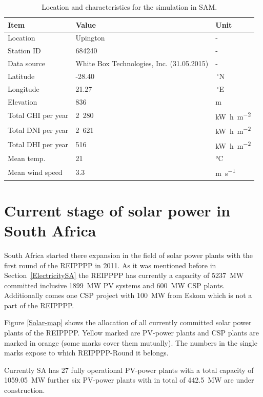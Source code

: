 \begin{table}[!h]  
  \centering
	\begin{tabular}{  p{4.0cm}  C{4.0cm}  C{3.0cm} } 
	\hline	
\textbf{Item}  & \textbf{Value} & \textbf{Unit} \\ \hline \hline
Location & Upington & -\\ 
Station ID &  684240& -  \\ 
Data source & White Box Technologies, Inc. (31.05.2015) & -\\ \hline
Latitude & -28.40 &$\,^{\circ}$N \\ 
Longitude &  21.27 &$\,^{\circ}$E \\ 
Elevation &  836 & m \\ 
Total GHI per year  &  2~280 & \si{\kilo\watt\hour\per\square\metre}\\ 
Total DNI per year &  2~621 & \si{\kilo\watt\hour\per\square\metre}\\ 
Total DHI per year &  516 & \si{\kilo\watt\hour\per\square\metre}\\ 
Mean temp. &  21 & \si{\celsius}\\ 
Mean wind speed & 3.3 & \si{\metre\per\second}\\ \hline
\end{tabular}
\caption[Location and characteristics for the simulation in SAM.]{Location and characteristics for the simulation in SAM.}\label{tbl: Location}
\end{table}
\pagebreak
\section{Current stage of solar power in South Africa}
South Africa started there expansion in the field of solar power plants with the first round of the REIPPPP in 2011. As it was mentioned before in Section~\ref{ElectricitySA} the REIPPPP has currently a capacity of \SI{5237}{\mega\watt} committed inclusive \SI{1899}{\mega\watt} PV systems and \SI{600}{\mega\watt} CSP plants. Additionally comes one CSP project with \SI{100}{\mega\watt} from Eskom which is not a part of the REIPPPP.

Figure \ref{Solar-map} shows the allocation of all currently committed solar power plants of the REIPPPP. Yellow marked are PV-power plants and CSP plants are marked in orange (some marks cover them mutually). The numbers in the single marks expose to which REIPPPP-Round it belongs.

Currently SA has 27 fully operational PV-power plants with a total capacity of \SI{1059.05}{\mega\watt} further six PV-power plants with in total of \SI{442.5}{\mega\watt} are under construction. \cite{Forder2015}

